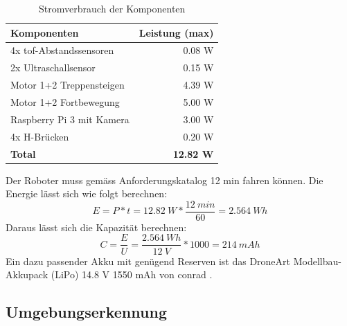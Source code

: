 \begin{table}[H]
\centering
\begin{tabular}{|l|r|}
\hline
\textbf{Komponenten} & \textbf{Leistung (max)} \\ \hline
4x \acrshort{tof}-Abstandssensoren & 0.08 W \\ \hline
2x Ultraschallsensor & 0.15 W \\ \hline
Motor 1+2 Treppensteigen & 4.39 W \\ \hline
Motor 1+2 Fortbewegung & 5.00 W \\ \hline
Raspberry Pi 3 mit Kamera & 3.00 W \\ \hline
4x H-Brücken & 0.20 W \\ \hline
\textbf{Total} & \textbf{12.82 W} \\ \hline
\end{tabular}
\caption{Stromverbrauch der Komponenten}
\label{tab:stromverbrauch-der-komponenten}
\end{table}


Der Roboter muss gemäss Anforderungskatalog 12 min fahren können. Die Energie lässt sich wie folgt berechnen:
\[E = P * t = 12.82\ W * \frac{12\ min}{60} = 2.564\ Wh\]
Daraus lässt sich die Kapazität berechnen:
\[C = \frac{E}{U} = \frac{2.564\ Wh}{12\ V} * 1000 = 214\ mAh\]
Ein dazu passender Akku mit genügend Reserven ist das DroneArt Modellbau-Akkupack (LiPo) 14.8 V 1550 mAh von conrad \cite{Akku}.


\newpage
\subsection{Umgebungserkennung}
